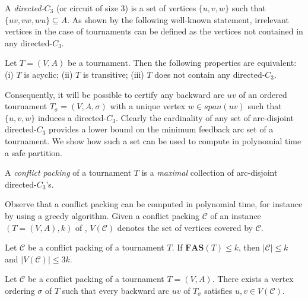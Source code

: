 A \emph{directed-$C_3$} (or circuit of size $3$) is a set of vertices $\{u,v,w\}$ such that $\{uv,vw,wu\}\subseteq A$. As shown by the following well-known statement, irrelevant vertices in the case of tournaments can be defined as the vertices not contained in any directed-$C_3$.

\begin{lemma}[Folklore]
\label{lem:folklore}
Let $T=(V,A)$ be a tournament. Then the following properties are equivalent: (i) $T$ is acyclic; (ii) $T$ is transitive; (iii) $T$ does not contain any directed-$C_3$.
\end{lemma}

Consequently, it will be possible to certify any backward arc $uv$ of an ordered tournament $T_{\sigma}=(V,A,\sigma)$ with a unique vertex $w\in span(uv)$ such that $\{u,v,w\}$ induces a directed-$C_3$. Clearly the cardinality of any set of arc-disjoint directed-$C_3$ provides a lower bound on the minimum feedback arc set of a tournament. We show how such a set can be used to compute in polynomial time a safe partition. 



\newcommand{\T}{T_{\sigma}}
\newcommand{\V}{V_{\sigma}}

\begin{definition} \label{def:cpfast}
A \emph{conflict packing} of a tournament $T$ is a \emph{maximal} collection of arc-disjoint directed-$C_3$'s.
\end{definition}

Observe that a conflict packing can be computed in polynomial time, for instance by using a greedy algorithm. Given a conflict packing $\mathcal{C}$ of an instance $(T = (V,A),k)$ of \FAST{}, $V(\mathcal{C})$ denotes the set of vertices covered by $\mathcal{C}$. 

\begin{observation} \label{lem:cpfast}
Let $\mathcal{C}$ be a conflict packing of a tournament $T$. If $\mathbf{FAS}(T)\leqslant k$, then $|\mathcal{C}| \leqslant k$ and $|V(\mathcal{C})| \leqslant 3k$.
\end{observation}



\begin{lemma} \label{lem:realcpfast}
Let $\mathcal{C}$ be a conflict packing of a tournament $T=(V,A)$. There exists a vertex ordering $\sigma$ of $T$ such that every backward arc $uv$ of $T_{\sigma}$ satisfies $u,v \in V(\mathcal{C})$.
\end{lemma}


